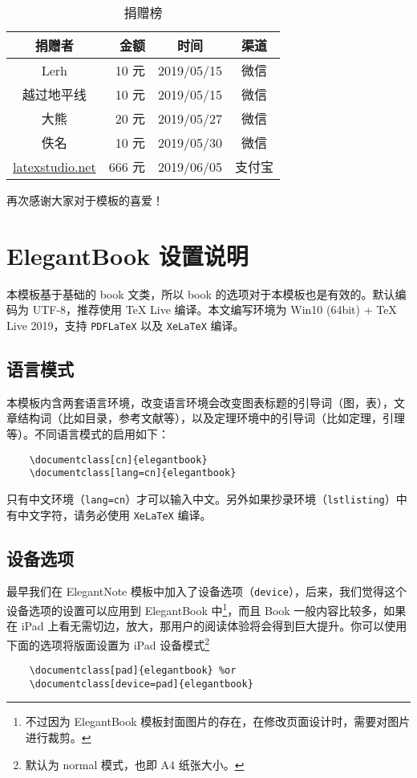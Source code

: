 	\begin{table}[htbp]
 \centering
 \caption{捐赠榜}
  \begin{tabular}{crcc}
  \toprule
  捐赠者   & 金额 & 时间 & 渠道 \\
  \midrule
  Lerh  & 10 元  & 2019/05/15 & 微信 \\
  越过地平线 & 10 元    & 2019/05/15 & 微信 \\
		大熊 &  20 元 & 2019/05/27 & 微信 \\
		佚名 & 10 元 & 2019/05/30 & 微信\\
		\href{http://www.latexstudio.net/}{latexstudio.net} & 666 元 & 2019/06/05 & 支付宝\\
  \bottomrule
  \end{tabular}%
	\end{table}%
	
	再次感谢大家对于模板的喜爱！
	
	\chapter{ElegantBook 设置说明}
	本模板基于基础的 book 文类，所以 book 的选项对于本模板也是有效的。默认编码为 UTF-8，推荐使用 \TeX{} Live 编译。本文编写环境为 Win10 (64bit) + \TeX{} Live 2019，支持 \lstinline{PDFLaTeX} 以及 \lstinline{XeLaTeX} 编译。
	
	
	\section{语言模式}
	本模板内含两套语言环境，改变语言环境会改变图表标题的引导词（图，表），文章结构词（比如目录，参考文献等），以及定理环境中的引导词（比如定理，引理等）。不同语言模式的启用如下：
	\begin{lstlisting}
	\documentclass[cn]{elegantbook} 
	\documentclass[lang=cn]{elegantbook}
	\end{lstlisting}
	
	\begin{remark}
	只有中文环境（\lstinline{lang=cn}）才可以输入中文。另外如果抄录环境（\lstinline{lstlisting}）中有中文字符，请务必使用 \lstinline{XeLaTeX} 编译。
	\end{remark}
	
	\section{设备选项}
	最早我们在 ElegantNote 模板中加入了设备选项（\lstinline{device}），后来，我们觉得这个设备选项的设置可以应用到 ElegantBook 中\footnote{不过因为 ElegantBook 模板封面图片的存在，在修改页面设计时，需要对图片进行裁剪。}，而且 Book 一般内容比较多，如果在 iPad 上看无需切边，放大，那用户的阅读体验将会得到巨大提升。你可以使用下面的选项将版面设置为 iPad 设备模式\footnote{默认为 normal 模式，也即 A4 纸张大小。}
	\begin{lstlisting}
	\documentclass[pad]{elegantbook} %or
	\documentclass[device=pad]{elegantbook}
	\end{lstlisting}
	
